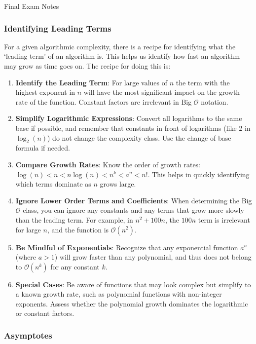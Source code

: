 \begin{examnotes}{Final Exam Notes}
    \subsubsection*{Identifying Leading Terms}

    For a given algorithmic complexity, there is a recipe for identifying what the `leading term' of an algorithm is. This helps us identify how fast an algorithm may grow as time goes on. The recipe
    for doing this is:

    \begin{enumerate}
        \item \textbf{Identify the Leading Term}: For large values of $n$ the term with the highest exponent in $n$ will have the most significant impact on the growth rate of the function. Constant 
        factors are irrelevant in Big $\mathcal{O}$ notation.
        \item \textbf{Simplify Logarithmic Expressions}: Convert all logarithms to the same base if possible, and remember that constants in front of logarithms (like 2 in $\log_{2}{(n)}$) do not 
        change the complexity class. Use the change of base formula if needed.
        \item \textbf{Compare Growth Rates}: Know the order of growth rates: $\log{(n)} < n < n \log{(n)} < n^{k} < a^{n} < n!$. This helps in quickly identifying which terms dominate as $n$ grows large.
        \item \textbf{Ignore Lower Order Terms and Coefficients}: When determining the Big $\mathcal{O}$ class, you can ignore any constants and any terms that grow more slowly than the leading term. 
        For example, in $n^{2} + 100n$, the $100n$ term is irrelevant for large $n$, and the function is $\mathcal{O}(n^{2})$.
        \item \textbf{Be Mindful of Exponentials}: Recognize that any exponential function $a^{n}$ (where $a > 1$) will grow faster than any polynomial, and thus does not belong to $\mathcal{O}(n^{k})$ 
        for any constant $k$.
        \item \textbf{Special Cases}: Be aware of functions that may look complex but simplify to a known growth rate, such as polynomial functions with non-integer exponents. Assess whether the 
        polynomial growth dominates the logarithmic or constant factors.
    \end{enumerate}

    \subsubsection*{Asymptotes}


\end{examnotes}
